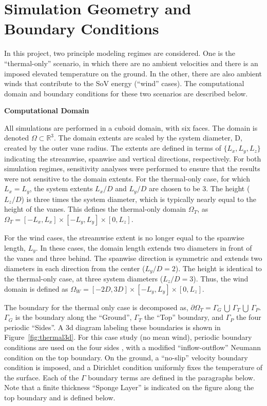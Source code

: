 \section{Simulation Geometry and Boundary Conditions}
\label{sec:bc}

In this project, two principle modeling regimes are considered.  
One is the ``thermal-only'' scenario, in which there are no ambient
velocities and there is an imposed elevated temperature on the ground.  
In the other, there are also ambient winds that contribute to the SoV energy
(``wind'' cases). 
The computational domain and boundary conditions for these 
two scenarios are described below.

\textbf{Computational Domain} 

All simulations are performed in a cuboid domain, with six
faces.  The domain is denoted $\Omega \subset \mathbb{R}^3$. 
The domain extents are scaled by the system diameter, D, created by the
outer vane radius. The extents are defined in terms of $\{L_x,L_y,L_z\}$ indicating the 
streamwise, spanwise and vertical directions, respectively. 
For both simulation regimes, sensitivity analyses 
were performed to ensure that the results were not sensitive 
to the domain extents. For the thermal-only case, for which $L_x = L_y$,
the system 
extents $L_x/D$ and $L_y/D$ are chosen to be 3. The height ($L_z/D$) is
three times the system diameter, which is typically nearly equal to the
height of the vanes. This defines the thermal-only domain $\Omega_T$, 
as $\Omega_T = \left[-L_x,L_x \right] \times \left[-L_y,L_y \right]
\times \left[0,L_z \right]$.   

For the wind cases, the streamwise extent is no longer equal to
the spanwise length, $L_y$. In these cases, the domain length extends
two diameters in front of the vanes and three behind. The
spanwise direction is symmetric and extends two diameters in each direction 
from the center ($L_y/D = 2$). The height is identical to the
thermal-only case, at three system diameters ($L_z/D = 3$). Thus, the
wind domain is defined as $\Omega_W = \left[-2D,3D \right] \times
\left[-L_y,L_y \right] \times \left[0,L_z \right]$.   

The boundary for the thermal only case is decomposed as,
$\partial \Omega_T = \Gamma_G \, \bigcup \, \Gamma_T \, \bigcup \, \Gamma_P $. 
$\Gamma_G$ is the boundary along the ``Ground'', $\Gamma_T$
the ``Top'' boundary, and $\Gamma_P$ the four periodic ``Sides''. A 3d
diagram labeling these boundaries is shown in
Figure~\ref{fig:thermal3d}. For this case study (no mean wind),
periodic boundary conditions are used on the four sides , with a modified 
``inflow-outflow'' Neumann condition\cite{gunzburger1989finite} on the
top boundary. On the ground, a ``no-slip'' velocity boundary condition is
imposed, and a Dirichlet condition uniformly fixes
the temperature of the surface. 
Each of the $\Gamma$ boundary terms are defined in the paragraphs below. 
Note that a finite thickness ``Sponge Layer'' is
indicated on the figure along the top boundary and is defined below. 

